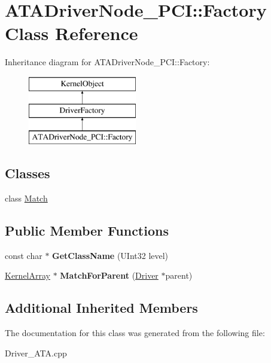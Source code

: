 \hypertarget{class_a_t_a_driver_node___p_c_i_1_1_factory}{}\section{A\+T\+A\+Driver\+Node\+\_\+\+P\+CI\+:\+:Factory Class Reference}
\label{class_a_t_a_driver_node___p_c_i_1_1_factory}
Inheritance diagram for A\+T\+A\+Driver\+Node\+\_\+\+P\+CI\+:\+:Factory\+:\begin{figure}[H]
\begin{center}
\leavevmode
\includegraphics[height=3.000000cm]{class_a_t_a_driver_node___p_c_i_1_1_factory}
\end{center}
\end{figure}
\subsection*{Classes}
\begin{DoxyCompactItemize}
\item 
class \hyperlink{class_a_t_a_driver_node___p_c_i_1_1_factory_1_1_match}{Match}
\end{DoxyCompactItemize}
\subsection*{Public Member Functions}
\begin{DoxyCompactItemize}
\item 
\mbox{\label{class_a_t_a_driver_node___p_c_i_1_1_factory_abec01459a9aa821e1e1ba3a1716c035f}} 
const char $\ast$ {\bfseries Get\+Class\+Name} (U\+Int32 level)
\item 
\mbox{\label{class_a_t_a_driver_node___p_c_i_1_1_factory_aabb222d09a3fb9884208c4de48dd5f39}} 
\hyperlink{class_kernel_array}{Kernel\+Array} $\ast$ {\bfseries Match\+For\+Parent} (\hyperlink{class_driver}{Driver} $\ast$parent)
\end{DoxyCompactItemize}
\subsection*{Additional Inherited Members}


The documentation for this class was generated from the following file\+:\begin{DoxyCompactItemize}
\item 
Driver\+\_\+\+A\+T\+A.\+cpp\end{DoxyCompactItemize}
